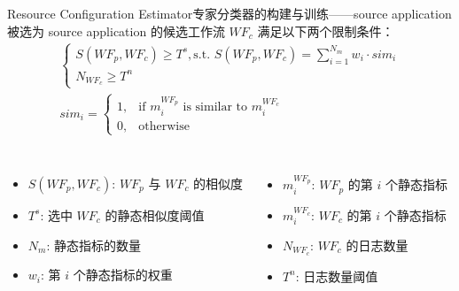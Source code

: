 \documentclass[aspectratio=169]{beamer}
\begin{document}
\begin{frame}{Resource Configuration Estimator}{专家分类器的构建与训练——source application}
  被选为 source application 的候选工作流 $WF_c$ 满足以下两个限制条件：
  \begin{gather*}
    \begin{cases}
      S(WF_p,WF_c) \geqslant T^s, \text{s.t. } S(WF_p,WF_c) = \sum_{i=1}^{N_m} w_i \cdot sim_i \\
      N_{WF_c} \geqslant T^n
    \end{cases} \\
    sim_i =
    \begin{cases}
      1, & \text{if } m_i^{WF_p} \text{ is similar to } m_i^{WF_c} \\
      0, & \text{otherwise}
    \end{cases}
  \end{gather*}
  \begin{columns}
    \begin{itemize}
      \item $S(WF_p,WF_c)$: $WF_p$ 与 $WF_c$ 的相似度
      \item $T^s$: 选中 $WF_c$ 的静态相似度阈值
      \item $N_m$: 静态指标的数量
      \item $w_i$: 第 $i$ 个静态指标的权重
    \end{itemize}

    \begin{itemize}
      \item $m_i^{WF_p}$: $WF_p$ 的第 $i$ 个静态指标
      \item $m_i^{WF_c}$: $WF_c$ 的第 $i$ 个静态指标
      \item $N_{WF_c}$: $WF_c$ 的日志数量
      \item $T^n$: 日志数量阈值
    \end{itemize}
  \end{columns}
\end{frame}
\end{document}
